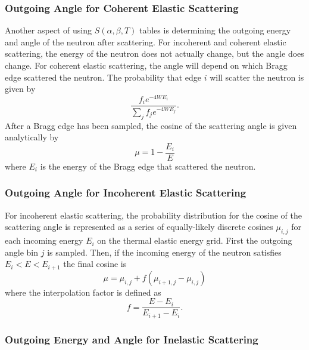 \subsubsection{Outgoing Angle for Coherent Elastic Scattering}

Another aspect of using $S(\alpha,\beta,T)$ tables is determining the outgoing
energy and angle of the neutron after scattering. For incoherent and coherent
elastic scattering, the energy of the neutron does not actually change, but the
angle does change. For coherent elastic scattering, the angle will depend on
which Bragg edge scattered the neutron. The probability that edge $i$ will
scatter the neutron is given by
\begin{equation}
  \label{eq:coherent-elastic-probability}
  \frac{f_i e^{-4WE_i}}{\sum_j f_j e^{-4WE_j}}.
\end{equation}
After a Bragg edge has been sampled, the cosine of the scattering angle is given
analytically by
\begin{equation}
  \label{eq:coherent-elastic-angle}
  \mu = 1 - \frac{E_i}{E}
\end{equation}
where $E_i$ is the energy of the Bragg edge that scattered the neutron. 

\subsubsection{Outgoing Angle for Incoherent Elastic Scattering}

For incoherent elastic scattering, the probability distribution for the cosine
of the scattering angle is represented as a series of equally-likely discrete
cosines $\mu_{i,j}$ for each incoming energy $E_i$ on the thermal elastic energy
grid. First the outgoing angle bin $j$ is sampled. Then, if the incoming energy
of the neutron satisfies $E_i < E < E_{i+1}$ the final cosine is
\begin{equation}
  \label{eq:incoherent-elastic-angle}
  \mu = \mu_{i,j} + f (\mu_{i+1,j} - \mu_{i,j})
\end{equation}
where the interpolation factor is defined as
\begin{equation}
  \label{eq:sab-interpolation-factor}
  f = \frac{E - E_i}{E_{i+1} - E_i}.
\end{equation}

\subsubsection{Outgoing Energy and Angle for Inelastic Scattering}


